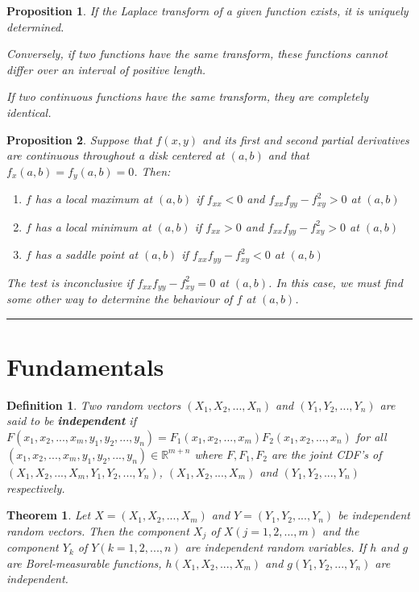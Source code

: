 \documentclass[14pt,twoside]{extreport}
\newcommand{\hhrule}{\vspace{1cm}\hrule\vspace{1cm}}
\theoremstyle{dotless}
\newtheorem*{defn}{Definition}
\newtheorem*{thm}{Theorem} %
\newtheorem*{prop}{Proposition} %
\begin{document}
\begin{prop}
    If the Laplace transform of a given function exists, it is uniquely determined.
    
    Conversely, if two functions have the same transform, these functions cannot differ over an interval of positive length.

    If two continuous functions have the same transform, they are completely identical.
\end{prop}

\begin{prop}
    Suppose that $f(x,y)$ and its first and second partial derivatives are continuous throughout a disk centered at $(a,b)$ and that $f_x(a,b) = f_y(a,b) = 0$. Then:
    \begin{enumerate}
        \item $f$ has a local maximum at $(a,b)$ if $f_{xx} < 0$ and $f_{xx}f_{yy} - f_{xy}^2 > 0$ at $(a,b)$
        \item $f$ has a local minimum at $(a,b)$ if $f_{xx} > 0$ and $f_{xx}f_{yy} - f_{xy}^2 > 0$ at $(a,b)$
        \item $f$ has a saddle point at $(a,b)$ if $f_{xx}f_{yy} - f_{xy}^2 < 0$ at $(a,b)$
    \end{enumerate}
    The test is inconclusive if $f_{xx}f_{yy} - f_{xy}^2 = 0$ at $(a,b)$. In this case, we must find some other way to determine the behaviour of $f$ at $(a,b)$.
\end{prop}

\hhrule
\section*{Fundamentals}

\begin{defn}
    Two random vectors $(X_1, X_2, ... , X_n)$ and $(Y_1, Y_2, ... , Y_n)$ are said to be \textbf{independent} if $F(x_1, x_2, ..., x_m, y_1, y_2, ..., y_n) = F_1 (x_1, x_2, ..., x_m) F_2 (x_1, x_2, ..., x_n)$ for all $(x_1, x_2, ..., x_m, y_1, y_2, ..., y_n) \in \mathbb{R}^{m+n}$ where $F, F_1, F_2$ are the joint CDF's of $(X_1, X_2, ..., X_m, Y_1, Y_2, ..., Y_n)$, $(X_1, X_2, ..., X_m)$ and $(Y_1, Y_2, ..., Y_n)$ respectively.
\end{defn}

\begin{thm}
    Let $X = (X_1, X_2, ... , X_m)$ and $Y = (Y_1, Y_2, ... , Y_n)$ be independent random vectors. Then the component $X_j$ of $X(j = 1, 2, ... , m)$ and the component $Y_k$ of $Y(k = 1, 2, ... , n)$ are independent random variables. If $h$ and $g$ are Borel-measurable functions, $h(X_1, X_2, ..., X_m)$ and $g(Y_1, Y_2, ... , Y_n)$ are independent.
\end{thm}
\end{document}
